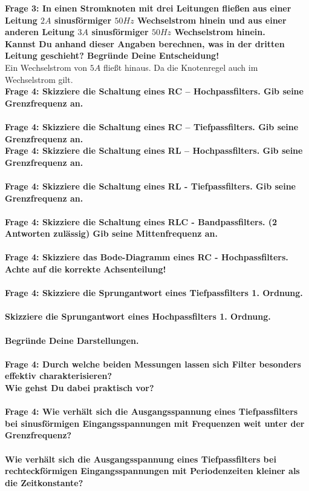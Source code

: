 \documentclass[11pt,a4paper]{scrartcl}
\begin{document}
\textbf{Frage 3: In einen Stromknoten mit drei Leitungen fließen aus einer Leitung $2A$ sinusförmiger $50Hz$ Wechselstrom hinein und aus einer anderen Leitung $3A$ sinusförmiger $50Hz$ Wechselstrom hinein. \\
Kannst Du anhand dieser Angaben berechnen, was in der dritten Leitung geschieht? Begründe Deine Entscheidung!}\\
Ein Wechselstrom von $5A$ fließt hinaus. Da die Knotenregel auch im Wechselstrom gilt.\\
\textbf{Frage 4: Skizziere die Schaltung eines RC – Hochpassfilters. Gib seine Grenzfrequenz an.}\\
\\
\textbf{Frage 4: Skizziere die Schaltung eines RC – Tiefpassfilters. Gib seine Grenzfrequenz an.}
\\
\textbf{Frage 4: Skizziere die Schaltung eines RL – Hochpassfilters. Gib seine Grenzfrequenz an.}\\
\\
\textbf{Frage 4: Skizziere die Schaltung eines RL - Tiefpassfilters. Gib seine Grenzfrequenz an.}\\
\\
\textbf{Frage 4: Skizziere die Schaltung eines RLC - Bandpassfilters. (2 Antworten zulässig) Gib seine Mittenfrequenz an.}\\
\\
\textbf{Frage 4: Skizziere das Bode-Diagramm eines RC - Hochpassfilters. Achte auf die korrekte Achsenteilung!}\\
\\
\textbf{Frage 4: Skizziere die Sprungantwort eines Tiefpassfilters 1. Ordnung.}\\
\\
\textbf{Skizziere die Sprungantwort eines Hochpassfilters 1. Ordnung.}\\
\\
\textbf{Begründe Deine Darstellungen.}\\
\\
\textbf{Frage 4: Durch welche beiden Messungen lassen sich Filter besonders effektiv charakterisieren?}
\\
\textbf{Wie gehst Du dabei praktisch vor?}\\
\\
\textbf{Frage 4: Wie verhält sich die Ausgangsspannung eines Tiefpassfilters bei sinusförmigen Eingangsspannungen mit Frequenzen weit unter der Grenzfrequenz?}\\
\\
\textbf{Wie verhält sich die Ausgangsspannung eines Tiefpassfilters bei rechteckförmigen Eingangsspannungen mit Periodenzeiten kleiner als die Zeitkonstante?}\\
\end{document}
